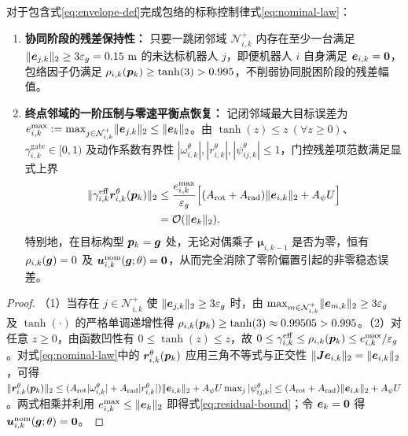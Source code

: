 \begin{proposition}[闭邻域完成包络的一阶消隐与终点渐近线性化性质]\label{prop:envelope}
对于包含式\eqref{eq:envelope-def}完成包络的标称控制律式\eqref{eq:nominal-law}：
\begin{enumerate}
 \item \textbf{协同阶段的残差保持性：} 只要一跳闭邻域 $\mathcal N_{i,k}^+$ 内存在至少一台满足 $\lVert\boldsymbol{e}_{j,k}\rVert_2\ge 3\varepsilon_g=0.15\ \mathrm m$ 的未达标机器人 $j$，即便机器人 $i$ 自身满足 $\boldsymbol{e}_{i,k}=\boldsymbol 0$，包络因子仍满足 $\rho_{i,k}(\boldsymbol{p}_k)\ge\tanh(3)>0.995$，不削弱协同脱困阶段的残差幅值。
 \item \textbf{终点邻域的一阶压制与零速平衡点恢复：} 记闭邻域最大目标误差为 $e_{i,k}^{\max}:=\max_{j\in\mathcal N_{i,k}^+}\lVert\boldsymbol{e}_{j,k}\rVert_2\le\lVert\boldsymbol{e}_k\rVert_2$。由 $\tanh(z)\le z\ (\forall z\ge 0)$、$\gamma_{i,k}^{\mathrm{gate}}\in[0,1)$ 及动作系数有界性 $|\omega_{i,k}^\theta|,|r_{i,k}^\theta|,|\psi_{ij,k}^\theta|\le 1$，门控残差项范数满足显式上界
 \begin{equation}
\begin{split}
  \lVert\gamma_{i,k}^{\mathrm{eff}}\boldsymbol{r}_{i,k}^\theta(\boldsymbol{p}_k)\rVert_2
  &\le \frac{e_{i,k}^{\max}}{\varepsilon_g}\Big[(A_{\mathrm{rot}}+A_{\mathrm{rad}})\lVert\boldsymbol{e}_{i,k}\rVert_2+A_\psi U\Big]\\
  &=\mathcal O(\lVert\boldsymbol{e}_k\rVert_2).
\end{split}
  \label{eq:residual-bound}
 \end{equation}
 特别地，在目标构型 $\boldsymbol{p}_k=\boldsymbol{g}$ 处，无论对偶乘子 $\boldsymbol\mu_{i,k-1}$ 是否为零，恒有 $\rho_{i,k}(\boldsymbol{g})=0$ 及 $\boldsymbol{u}_{i,k}^{\mathrm{nom}}(\boldsymbol{g};\theta)=\boldsymbol 0$，从而完全消除了零阶偏置引起的非零稳态误差。
\end{enumerate}
\end{proposition}
\begin{proof}
（1）当存在 $j\in\mathcal N_{i,k}^+$ 使 $\lVert\boldsymbol{e}_{j,k}\rVert_2\ge 3\varepsilon_g$ 时，由 $\max_{m\in\mathcal N_{i,k}^+}\lVert\boldsymbol{e}_{m,k}\rVert_2\ge 3\varepsilon_g$ 及 $\tanh(\cdot)$ 的严格单调递增性得 $\rho_{i,k}(\boldsymbol{p}_k)\ge\tanh(3)\approx 0.99505>0.995$。（2）对任意 $z\ge 0$，由函数凹性有 $0\le\tanh(z)\le z$，故 $0\le\gamma_{i,k}^{\mathrm{eff}}\le\rho_{i,k}(\boldsymbol{p}_k)\le e_{i,k}^{\max}/\varepsilon_g$。对式\eqref{eq:nominal-law}中的 $\boldsymbol{r}_{i,k}^\theta(\boldsymbol{p}_k)$ 应用三角不等式与正交性 $\lVert\boldsymbol{J}\boldsymbol{e}_{i,k}\rVert_2=\lVert\boldsymbol{e}_{i,k}\rVert_2$，可得 $\lVert\boldsymbol{r}_{i,k}^\theta(\boldsymbol{p}_k)\rVert_2\le(A_{\mathrm{rot}}|\omega_{i,k}^\theta|+A_{\mathrm{rad}}|r_{i,k}^\theta|)\lVert\boldsymbol{e}_{i,k}\rVert_2+A_\psi U\max_j|\psi_{ij,k}^\theta|\le(A_{\mathrm{rot}}+A_{\mathrm{rad}})\lVert\boldsymbol{e}_{i,k}\rVert_2+A_\psi U$。两式相乘并利用 $e_{i,k}^{\max}\le\lVert\boldsymbol{e}_k\rVert_2$ 即得式\eqref{eq:residual-bound}；令 $\boldsymbol{e}_k=\boldsymbol 0$ 得 $\boldsymbol{u}_{i,k}^{\mathrm{nom}}(\boldsymbol{g};\theta)=\boldsymbol 0$。
\end{proof}

